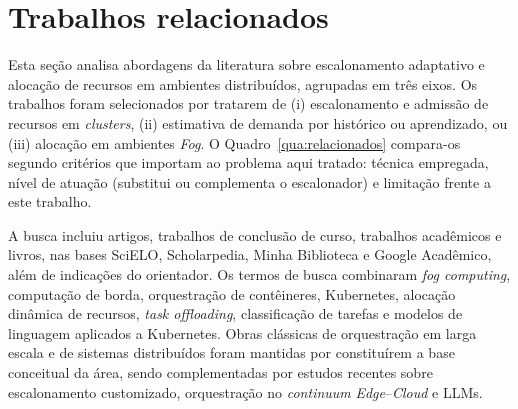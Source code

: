 \documentclass[11pt,a4paper]{article}
\begin{document}
\section{Trabalhos relacionados}\label{sec:relacionados}

Esta seção analisa abordagens da literatura sobre escalonamento adaptativo e
alocação de recursos em ambientes distribuídos, agrupadas em três eixos. Os
trabalhos foram selecionados por tratarem de (i) escalonamento e
admissão de recursos em \textit{clusters}, (ii) estimativa de demanda por
histórico ou aprendizado, ou (iii) alocação em ambientes \textit{Fog}. O
Quadro~\ref{qua:relacionados} compara-os segundo critérios que importam ao
problema aqui tratado: técnica empregada, nível de atuação (substitui ou
complementa o escalonador) e limitação frente a este trabalho.

A busca incluiu artigos, trabalhos de conclusão de curso, trabalhos
acadêmicos e livros, nas bases SciELO, Scholarpedia, Minha Biblioteca e Google
Acadêmico, além de indicações do orientador.
Os termos de busca combinaram \textit{fog computing}, computação de borda,
orquestração de contêineres, Kubernetes, alocação dinâmica de recursos,
\textit{task offloading}, classificação de tarefas e modelos de linguagem
aplicados a Kubernetes. Obras clássicas de orquestração em larga escala e de
sistemas distribuídos foram mantidas por constituírem a base conceitual da
área, sendo complementadas por estudos recentes sobre escalonamento
customizado, orquestração no \textit{continuum} \textit{Edge}--\textit{Cloud}
e LLMs.
\end{document}
